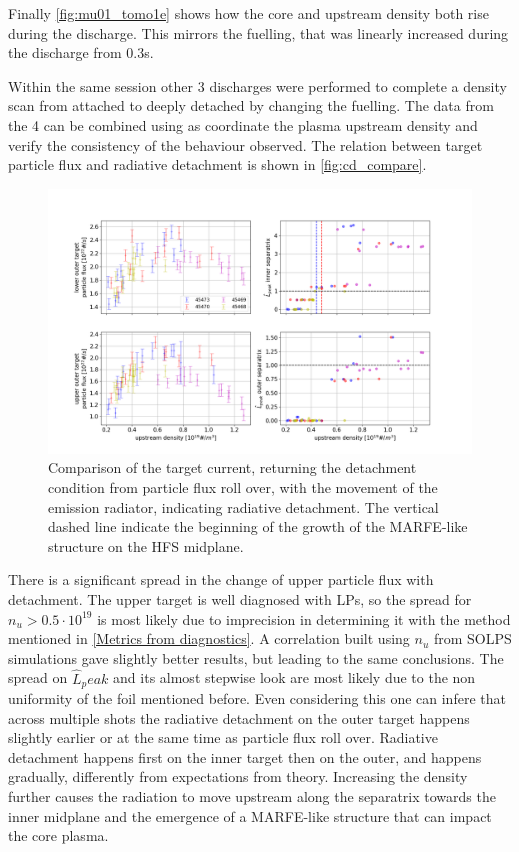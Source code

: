 Finally \autoref{fig:mu01_tomo1e} shows how the core and upstream density both rise during the discharge. This mirrors the fuelling, that was linearly increased during the discharge from 0.3s.


Within the same session other 3 discharges were performed to complete a density scan from attached to deeply detached by changing the fuelling. The data from the 4 can be combined using as coordinate the plasma upstream density and verify the consistency of the behaviour observed. The relation between target particle flux and radiative detachment is shown in \autoref{fig:cd_compare}.
\begin{figure}
	\centering
	\includegraphics[trim={70 30 110 50},clip,width=\linewidth]{Chapters/chapter2/figs/CD_OH_MU01_compare.png}
	\caption{Comparison of the target current, returning the detachment condition from particle flux roll over, with the movement of the emission radiator, indicating radiative detachment. The vertical dashed line indicate the beginning of the growth of the MARFE-like structure on the HFS midplane.}
	\label{fig:cd_compare}
\end{figure}
There is a significant spread in the change of upper particle flux with detachment. The upper target is well diagnosed with LPs, so the spread for $n_u > 0.5\cdot 10^{19}$ is most likely due to imprecision in determining it with the method mentioned in \autoref{Metrics from diagnostics}. A correlation built using $n_u$ from SOLPS simulations gave slightly better results, but leading to the same conclusions. The spread on ${\hat{L}}_peak$ and its almost stepwise look are most likely due to the non uniformity of the foil mentioned before. Even considering this one can infere that across multiple shots the radiative detachment on the outer target happens slightly earlier or at the same time as particle flux roll over. Radiative detachment happens first on the inner target then on the outer, and happens gradually, differently from expectations from theory.\cite{Lipschultz2016} Increasing the density further causes the radiation to move upstream along the separatrix towards the inner midplane and the emergence of a MARFE-like structure that can impact the core plasma.

